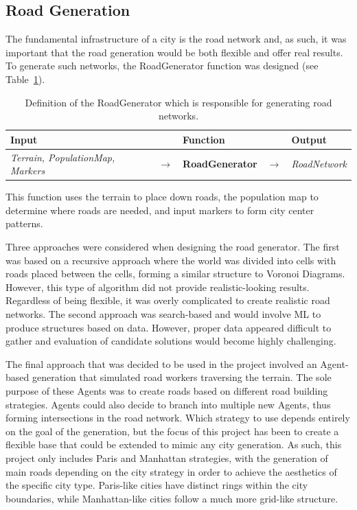 \subsection{Road Generation}

The fundamental infrastructure of a city is the road network and, as such, it was important that the road generation would be both flexible and offer real results.
To generate such networks, the RoadGenerator function was designed (see Table~\ref{table:def_roadgen}).

\begin{table}[H]
  \centering
  \begin{tabular}{lllll}
    \textbf{Input} & & \textbf{Function} & & \textbf{Output} \\
    \midrule
    \textit{Terrain, PopulationMap, Markers} & $\rightarrow$ & \textbf{RoadGenerator}       & $\rightarrow$ & \textit{RoadNetwork}    \\
    \bottomrule
  \end{tabular}

  \caption{Definition of the RoadGenerator which is responsible for generating road networks.}
  \label{table:def_roadgen}
\end{table}
\vspace{-0.4cm}

This function uses the terrain to place down roads, the population map to determine where roads are needed, and input markers to form city center patterns.

Three approaches were considered when designing the road generator.
The first was based on a recursive approach where the world was divided into cells with roads placed between the cells, forming a similar structure to Voronoi Diagrams.
However, this type of algorithm did not provide realistic-looking results.
Regardless of being flexible, it was overly complicated to create realistic road networks.
The second approach was search-based and would involve ML to produce structures based on data.
However, proper data appeared difficult to gather and evaluation of candidate solutions would become highly challenging.

The final approach that was decided to be used in the project involved an Agent-based generation that simulated road workers traversing the terrain.
The sole purpose of these Agents was to create roads based on different road building strategies.
Agents could also decide to branch into multiple new Agents, thus forming intersections in the road network.
Which strategy to use depends entirely on the goal of the generation, but the focus of this project has been to create a flexible base that could be extended to mimic any city generation.
As such, this project only includes Paris and Manhattan strategies, with the generation of main roads depending on the city strategy in order to achieve the aesthetics of the specific city type.
Paris-like cities have distinct rings within the city boundaries, while Manhattan-like cities follow a much more grid-like structure.


